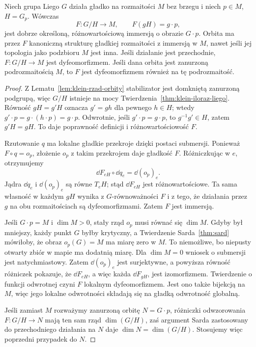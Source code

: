 \begin{twierdzenie}
\label{thm:klein-orbita-iloraz}
Niech grupa Liego $G$ działa gładko na rozmaitości $M$ bez brzegu
i niech $p\in M$, $H=G_p$. Wówczas
\[
 F:G/H\longrightarrow M,\qquad F(gH)=g\cdot p,
\]
jest dobrze określoną, różnowartościową immersją o obrazie
$G\cdot p$. Orbita ma przez $F$ kanoniczną strukturę gładkiej
rozmaitości z immersją w $M$, nawet jeśli jej topologia jako
podzbioru $M$ jest inna. Jeśli działanie jest przechodnie,
$F:G/H\to M$ jest
dyfeomorfizmem. Jeśli dana orbita jest zanurzoną podrozmaitością
$M$, to $F$ jest dyfeomorfizmem również na tę podrozmaitość.
\end{twierdzenie}
\begin{proof}
Z Lematu~\ref{lem:klein-rzad-orbity} stabilizator jest domkniętą
zanurzoną podgrupą, więc $G/H$ istnieje na mocy
Twierdzenia~\ref{thm:klein-iloraz-liego}. Równość
$gH=g'H$ oznacza $g'=gh$ dla pewnego $h\in H$; wtedy
$g'\cdot p=g\cdot(h\cdot p)=g\cdot p$. Odwrotnie, jeśli
$g'\cdot p=g\cdot p$, to $g^{-1}g'\in H$, zatem $g'H=gH$.
To daje poprawność definicji i różnowartościowość $F$.

Rzutowanie $q$ ma lokalne gładkie przekroje dzięki postaci
submersji. Ponieważ $F\circ q=o_p$, złożenie $o_p$ z takim
przekrojem daje gładkość $F$. Różniczkując w $e$, otrzymujemy
\[
 \dd F_{eH}\circ\dd q_e=\dd(o_p)_e.
\]
Jądra $\dd q_e$ i $\dd(o_p)_e$ są równe $T_eH$;
stąd $\dd F_{eH}$ jest różnowartościowe. Ta sama własność
w każdym $gH$ wynika z $G$-równoważności $F$ i z tego, że
działania przez $g$ na obu rozmaitościach są dyfeomorfizmami.
Zatem $F$ jest immersją.

Jeśli $G\cdot p=M$ i $\dim M>0$, stały rząd $o_p$ musi
równać się $\dim M$. Gdyby był mniejszy, każdy punkt $G$
byłby krytyczny, a Twierdzenie Sarda~\ref{thm:sard} mówiłoby,
że obraz $o_p(G)=M$ ma miarę zero w $M$. To niemożliwe,
bo niepusty otwarty zbiór w mapie ma dodatnią miarę.
Dla $\dim M=0$ wniosek o submersji jest natychmiastowy.
Zatem $\dd(o_p)_e$ jest surjektywne, a powyższa równość
różniczek pokazuje, że $\dd F_{eH}$, a więc każda
$\dd F_{gH}$, jest izomorfizmem. Twierdzenie o funkcji
odwrotnej czyni $F$ lokalnym dyfeomorfizmem. Jest ono także
bijekcją na $M$, więc jego lokalne odwrotności składają się
na gładką odwrotność globalną.

Jeśli zamiast $M$ rozważymy zanurzoną orbitę $N=G\cdot p$,
różniczki odwzorowania $F:G/H\to N$ mają ten sam rząd
$\dim(G/H)$, zaś argument Sarda zastosowany do przechodniego
działania na $N$ daje $\dim N=\dim(G/H)$. Stosujemy więc
poprzedni przypadek do $N$.
\end{proof}

